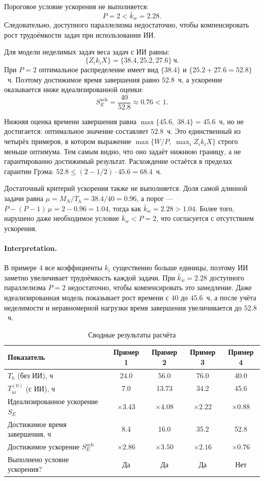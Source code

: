 \documentclass[12pt,a4paper]{article}
\theoremstyle{definition}
\begin{document}
Пороговое условие ускорения не выполняется:
\[
  P = 2 < \bar{k}_w = 2.28.
\]
Следовательно, доступного параллелизма недостаточно, чтобы компенсировать рост трудоёмкости задач при использовании ИИ.

Для модели неделимых задач веса задач с ИИ равны:
\[
  \{Z_i k_i X\} = \{38.4, 25.2, 27.6\}~\text{ч}.
\]
При $P=2$ оптимальное распределение имеет вид $\{38.4\}$ и $\{25.2 + 27.6 = 52.8\}$~ч. Поэтому достижимое время завершения равно $52.8$~ч, а ускорение оказывается ниже идеализированной оценки:
\[
  S_E^{\text{ach}} = \frac{40}{52.8} \approx 0.76 < 1.
\]

Нижняя оценка времени завершения равна $\max\{45.6,\; 38.4\} = 45.6$~ч, но не достигается: оптимальное значение составляет $52.8$~ч. Это единственный из четырёх примеров, в котором выражение $\max\{W/P,\; \max_i Z_i k_i X\}$ строго меньше оптимума. Тем самым видно, что оно задаёт нижнюю границу, а не гарантированно достижимый результат. Расхождение остаётся в пределах гарантии Грэма: $52.8 \le (2 - 1/2) \cdot 45.6 = 68.4$~ч.

Достаточный критерий ускорения также не выполняется. Доля самой длинной задачи равна $\mu = M_N/T_h = 38.4/40 = 0.96$, а порог --- $P - (P-1)\,\mu = 2 - 0.96 = 1.04$, тогда как $\bar{k}_w = 2.28 > 1.04$. Более того, нарушено даже необходимое условие $\bar{k}_w < P = 2$, что согласуется с отсутствием ускорения.

\paragraph{Interpretation.}
В примере 4 все коэффициенты $k_i$ существенно больше единицы, поэтому ИИ заметно увеличивает трудоёмкость каждой задачи. При $\bar{k}_w = 2.28$ доступного параллелизма $P=2$ недостаточно, чтобы компенсировать это замедление. Даже идеализированная модель показывает рост времени с $40$ до $45.6$~ч, а после учёта неделимости и неравномерной нагрузки время завершения увеличивается до $52.8$~ч.


\begin{table}[ht!]
\centering
\caption{Сводные результаты расчёта}
\label{tab:summary-results}
\begin{tabular}{lcccc}
\toprule
Показатель & Пример 1 & Пример 2 & Пример 3 & Пример 4 \\
\midrule
$T_h$ (без ИИ), ч & 24.0 & 56.0 & 76.0 & 40.0 \\
$T_{ai}^{(0)}$ (с ИИ), ч & 7.0 & 13.73 & 34.2 & 45.6 \\
Идеализированное ускорение $S_E$ & $\times 3.43$ & $\times 4.08$ & $\times 2.22$ & $\times 0.88$ \\
Достижимое время завершения, ч & 8.4 & 16.0 & 35.2 & 52.8 \\
Достижимое ускорение $S_E^{\text{ach}}$ & $\times 2.86$ & $\times 3.50$ & $\times 2.16$ & $\times 0.76$ \\
Выполнено условие ускорения? & Да & Да & Да & Нет \\
\bottomrule
\end{tabular}
\end{table}
\end{document}
